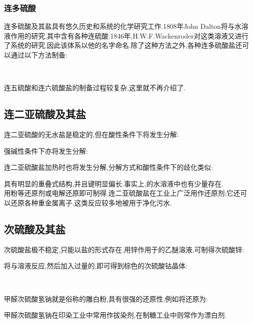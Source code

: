 \documentclass{ctexart}
\begin{document}
\subsubsection{连多硫酸}
连多硫酸及其盐具有悠久历史和系统的化学研究工作.1808年John Dalton将与水溶液作用的研究,其中含有各种连硫酸.1846年,H.W.F.Wackenroder对这类溶液又进行了系统的研究,因此该体系以他的名字命名.除了这种方法之外,各种连多硫酸盐还可以通过以下方法制备:
\begin{center}
    \\
\end{center}
连五硫酸和连六硫酸盐的制备过程较复杂,这里就不再介绍了.
\subsection{连二亚硫酸及其盐}
连二亚硫酸的无水盐是稳定的,但在酸性条件下将发生分解:
\begin{center}
\end{center}
强碱性条件下亦将发生分解:
\begin{center}
\end{center}
连二亚硫酸盐加热时也将发生分解,分解方式和酸性条件下的歧化类似:
\begin{center}
\end{center}
\indent {}具有明显的重叠式结构,并且键明显偏长.事实上,的水溶液中也有少量存在.\\
\indent 用粉等还原剂或电解还原即可制得.连二亚硫酸盐在工业上广泛用作还原剂;它还可以还原各种重金属离子.这类反应较多地被用于净化污水.
\subsection{次硫酸及其盐}
次硫酸盐极不稳定,只能以盐的形式存在.用锌作用于的乙醚溶液,可制得次硫酸锌:
\begin{center}
\end{center}
将与溶液反应,然后加入过量的,即可得到棕色的次硫酸钴晶体:
\begin{center}
    \\
\end{center}
甲醛次硫酸氢钠就是俗称的雕白粉,具有很强的还原性,例如将还原为:
\begin{center}
\end{center}
甲醛次硫酸氢钠在印染工业中常用作拔染剂,在制糖工业中则常作为漂白剂.
\end{document}
